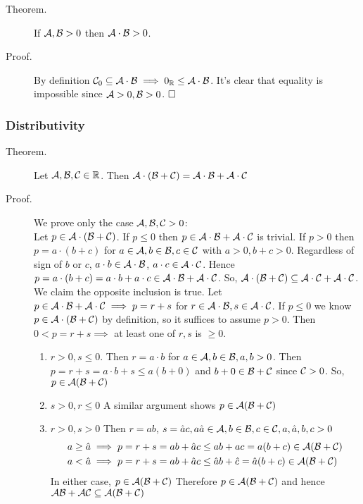 \documentclass[letterpaper,11pt]{article}
\begin{document}
\begin{description}
\item[Theorem.] If $\mathcal{A},\mathcal{B}>0$ then $\mathcal{A}\cdot\mathcal{B}>0$.
\item[Proof.] By definition $\mathcal{C}_0\subseteq\mathcal{A}\cdot\mathcal{B}\implies0_{\mathbb{R}}\le\mathcal{A}\cdot\mathcal{B}$.
    It's clear that equality is impossible since $\mathcal{A}>0,\mathcal{B}>0$. $\hfill\square$
\end{description}

\subsubsection{Distributivity}
\begin{description}
\item[Theorem.] Let $\mathcal{A},\mathcal{B},\mathcal{C}\in\mathbb{R}$. Then
    $\mathcal{A}\cdot(\mathcal{B}+\mathcal{C})=\mathcal{A}\cdot\mathcal{B}+\mathcal{A}\cdot\mathcal{C}$
\item[Proof.] We prove only the case $\mathcal{A},\mathcal{B},\mathcal{C}>0$:\\
    Let $p\in\mathcal{A}\cdot(\mathcal{B}+\mathcal{C})$. If $p\le0$ then $p\in\mathcal{A}\cdot\mathcal{B}+\mathcal{A}\cdot\mathcal{C}$
    is trivial. If $p>0$ then $p=a\cdot(b+c)$ for $a\in\mathcal{A},b\in\mathcal{B},c\in\mathcal{C}$ with
    $a>0,b+c>0$. Regardless of sign of $b$ or $c$, $a\cdot b\in\mathcal{A}\cdot\mathcal{B}$,
    $a\cdot c\in\mathcal{A}\cdot\mathcal{C}$. Hence
    $p=a\cdot(b+c)=a\cdot b+a\cdot c\in\mathcal{A}\cdot\mathcal{B}+\mathcal{A}\cdot\mathcal{C}$.
    So, $\mathcal{A}\cdot(\mathcal{B}+\mathcal{C})\subseteq\mathcal{A}\cdot\mathcal{C}+\mathcal{A}\cdot\mathcal{C}$.\\
    We claim the opposite inclusion is true. Let
    $p\in\mathcal{A}\cdot\mathcal{B}+\mathcal{A}\cdot\mathcal{C}\implies p=r+s$ for $r\in\mathcal{A}\cdot\mathcal{B}, s\in\mathcal{A}\cdot\mathcal{C}$.
    If $p\le0$ we know $p\in\mathcal{A}\cdot(\mathcal{B}+\mathcal{C})$ by definition, so it suffices
    to assume $p>0$. Then $0<p=r+s\implies$ at least one of $r,s$ is $\ge0$.
    \begin{enumerate}[C{a}se 1:]
    \item $r>0,s\le0$. Then $r=a\cdot b$ for $a\in\mathcal{A},b\in\mathcal{B},a,b>0$. Then
        $p=r+s=a\cdot b+s\le a(b+0)$ and $b+0\in\mathcal{B}+\mathcal{C}$
        since $\mathcal{C}>0$. So, $p\in\mathcal{A}(\mathcal{B}+\mathcal{C})$
    \item $s>0,r\le 0$ A similar argument shows $p\in\mathcal{A}(\mathcal{B}+\mathcal{C})$
    \item $r>0,s>0$ Then $r=ab$, $s=\hat{a}c,a\hat{a}\in\mathcal{A},b\in\mathcal{B},c\in\mathcal{C},a,\hat{a},b,c>0$
    \begin{align*}
    a\ge\hat{a}&\implies p=r+s= ab+\hat{a}c\le ab+ac = a(b+c)\in \mathcal{A}(\mathcal{B}+\mathcal{C})\\
    a<\hat{a}&\implies p=r+s=ab+\hat{a}c\le \hat{a}b+\hat{c}=\hat{a}(b+c)\in\mathcal{A}(\mathcal{B}+\mathcal{C})
    \end{align*}
    In either case, $p\in\mathcal{A}(\mathcal{B}+\mathcal{C})$
    Therefore $p\in\mathcal{A}(\mathcal{B}+\mathcal{C})$ and hence $\mathcal{A}\mathcal{B}+\mathcal{A}\mathcal{C}\subseteq\mathcal{A}(\mathcal{B}+\mathcal{C})$
    \end{enumerate}
\end{description}
\end{document}
